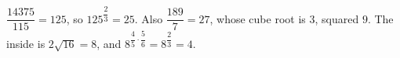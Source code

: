 $\dfrac{14375}{115}=125$, so $125^{\dfrac23}=25$. Also $\dfrac{189}7=27$, whose cube root is $3$, squared $9$. The inside is $2\sqrt{16}=8$, and $8^{\dfrac45\cdot\dfrac56}=8^{\dfrac23}=\boxed{4}$.
